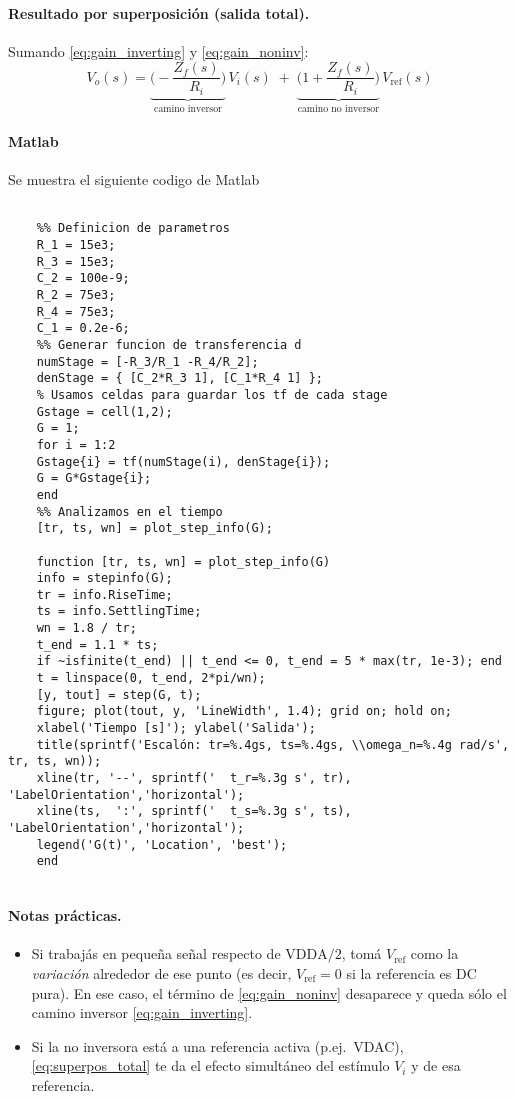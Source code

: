 \paragraph{Resultado por superposición (salida total).}
Sumando \eqref{eq:gain_inverting} y \eqref{eq:gain_noninv}:
\begin{equation}
	V_o(s)
	= \underbrace{\Bigg(-\frac{Z_f(s)}{R_i}\Bigg)}_{\text{camino inversor}}\,V_i(s)
	\;+\;
	\underbrace{\Bigg(1+\frac{Z_f(s)}{R_i}\Bigg)}_{\text{camino no inversor}}\,V_{\text{ref}}(s)
	\label{eq:superpos_total}
\end{equation}

\paragraph{Matlab} Se muestra el siguiente codigo de Matlab

\begin{lstlisting}[style=matlabstyle,caption={Script en Matlab},label={lst:mat}]
	
	%% Definicion de parametros
	R_1 = 15e3;
	R_3 = 15e3;
	C_2 = 100e-9;
	R_2 = 75e3;
	R_4 = 75e3;
	C_1 = 0.2e-6;
	%% Generar funcion de transferencia d
	numStage = [-R_3/R_1 -R_4/R_2];
	denStage = { [C_2*R_3 1], [C_1*R_4 1] };
	% Usamos celdas para guardar los tf de cada stage
	Gstage = cell(1,2);
	G = 1;
	for i = 1:2
	Gstage{i} = tf(numStage(i), denStage{i});
	G = G*Gstage{i};
	end
	%% Analizamos en el tiempo
	[tr, ts, wn] = plot_step_info(G);
	
	function [tr, ts, wn] = plot_step_info(G)
	info = stepinfo(G);
	tr = info.RiseTime;
	ts = info.SettlingTime;
	wn = 1.8 / tr;
	t_end = 1.1 * ts;
	if ~isfinite(t_end) || t_end <= 0, t_end = 5 * max(tr, 1e-3); end
	t = linspace(0, t_end, 2*pi/wn);
	[y, tout] = step(G, t);
	figure; plot(tout, y, 'LineWidth', 1.4); grid on; hold on;
	xlabel('Tiempo [s]'); ylabel('Salida');
	title(sprintf('Escalón: tr=%.4gs, ts=%.4gs, \\omega_n=%.4g rad/s', tr, ts, wn));
	xline(tr, '--', sprintf('  t_r=%.3g s', tr), 'LabelOrientation','horizontal');
	xline(ts,  ':', sprintf('  t_s=%.3g s', ts), 'LabelOrientation','horizontal');
	legend('G(t)', 'Location', 'best');
	end
	
\end{lstlisting}


\paragraph{Notas prácticas.}
\begin{itemize}
	\item Si trabajás en pequeña señal respecto de $\text{VDDA}/2$, tomá $V_{\text{ref}}$ como la \emph{variación} alrededor de ese punto (es decir, $V_{\text{ref}}=0$ si la referencia es DC pura). En ese caso, el término de \eqref{eq:gain_noninv} desaparece y queda sólo el camino inversor \eqref{eq:gain_inverting}.
	\item Si la no inversora está a una referencia activa (p.ej.\ VDAC), \eqref{eq:superpos_total} te da el efecto simultáneo del estímulo $V_i$ y de esa referencia.
\end{itemize}


